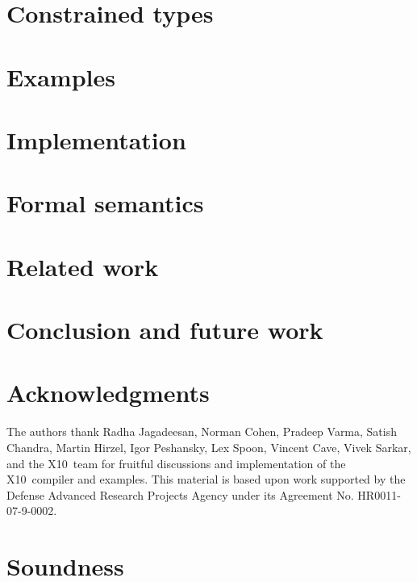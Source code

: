 \documentclass[10pt]{sigplanconf}
\newcommand\Xten{{\sf X10}}
\begin{document}
\section{Constrained types}\label{sec:lang}

\label{method-sec}


\section{Examples}\label{sec:examples}


\section{Implementation}\label{sec:implementation}
\label{sec:impl}


\section{Formal semantics}
\label{sec:semantics}


\section{Related work}\label{sec:related}


\section{Conclusion and future work}\label{sec:future}\label{sec:conclusions}
%

\fi

\section*{Acknowledgments}

The authors thank Radha Jagadeesan,
Norman Cohen, Pra\-deep Varma,
Satish Chandra, Martin Hirzel, Igor Peshansky,
Lex Spoon, Vincent Cave, Vivek Sarkar,
and the \Xten\ team for fruitful discussions and implementation of
the \Xten\ compiler and examples.
This material is based upon work supported by the Defense
Advanced Research Projects Agency under its Agreement No.
HR0011-07-9-0002.
\fi





\appendix

\section{Soundness}
\label{sec:proof}



% 
\end{document}
